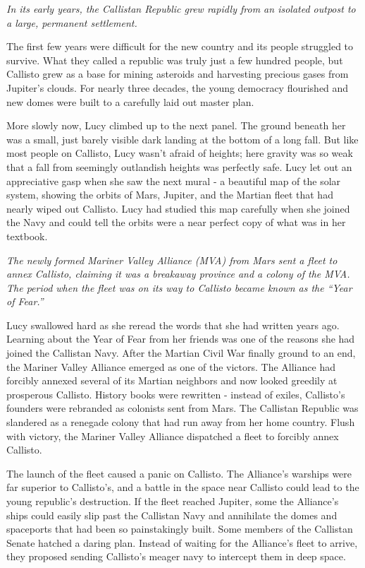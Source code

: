 \documentclass[openany, 12pt]{book} %
\begin{document}
\textit{In its early years, the Callistan Republic grew rapidly from an isolated outpost to a large, permanent settlement.}

The first few years were difficult for the new country and its people struggled to survive. What they called a republic was truly just a few hundred people, but Callisto grew as a base for mining asteroids and harvesting precious gases from Jupiter's clouds. For nearly three decades, the young democracy flourished and new domes were built to a carefully laid out master plan.

More slowly now, Lucy climbed up to the next panel. The ground beneath her was a small, just barely visible dark landing at the bottom of a long fall. But like most people on Callisto, Lucy wasn't afraid of heights; here gravity was so weak that a fall from seemingly outlandish heights was perfectly safe. Lucy let out an appreciative gasp when she saw the next mural - a beautiful map of the solar system, showing the orbits of Mars, Jupiter, and the Martian fleet that had nearly wiped out Callisto. Lucy had studied this map carefully when she joined the Navy and could tell the orbits were a near perfect copy of what was in her textbook.

\textit{The newly formed Mariner Valley Alliance (MVA) from Mars sent a fleet to annex Callisto, claiming it was a breakaway province and a colony of the MVA. The period when the fleet was on its way to Callisto became known as the ``Year of Fear.''}

Lucy swallowed hard as she reread the words that she had written years ago. Learning about the Year of Fear from her friends was one of the reasons she had joined the Callistan Navy. After the Martian Civil War finally ground to an end, the Mariner Valley Alliance emerged as one of the victors. The Alliance had forcibly annexed several of its Martian neighbors and now looked greedily at prosperous Callisto. History books were rewritten - instead of exiles, Callisto's founders were rebranded as colonists sent from Mars. The Callistan Republic was slandered as a renegade colony that had run away from her home country. Flush with victory, the Mariner Valley Alliance dispatched a fleet to forcibly annex Callisto.

The launch of the fleet caused a panic on Callisto. The Alliance's warships were far superior to Callisto's, and a battle in the space near Callisto could lead to the young republic's destruction. If the fleet reached Jupiter, some the Alliance's ships could easily slip past the Callistan Navy and annihilate the domes and spaceports that had been so painstakingly built. Some members of the Callistan Senate hatched a daring plan. Instead of waiting for the Alliance's fleet to arrive, they proposed sending Callisto's meager navy to intercept them in deep space.
\end{document}
